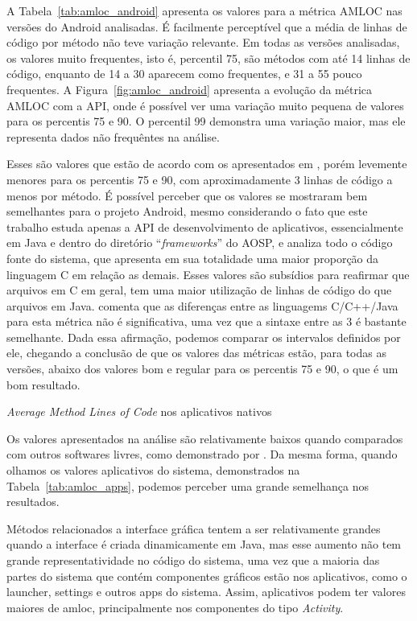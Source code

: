 A Tabela~\ref{tab:amloc_android} apresenta os valores para a métrica AMLOC nas versões do Android analisadas. É facilmente perceptível que a média de linhas de código por método não teve variação relevante. Em todas as versões analisadas, os valores muito frequentes, isto é, percentil 75, são métodos com até 14 linhas de código, enquanto de 14 a 30 aparecem como frequentes, e 31 a 55 pouco frequentes. A Figura~\ref{fig:amloc_android} apresenta a evolução da métrica AMLOC com a API, onde é possível ver uma variação muito pequena de valores para os percentis 75 e 90. O percentil 99 demonstra uma variação maior, mas ele representa dados não frequêntes na análise.

Esses são valores que estão de acordo com os apresentados em , porém levemente menores para os percentis 75 e 90, com aproximadamente 3 linhas de código a menos por método. É possível perceber que os valores se mostraram bem semelhantes para o projeto Android, mesmo considerando o fato que este trabalho estuda apenas a API de desenvolvimento de aplicativos, essencialmente em Java e dentro do diretório ``\textit{frameworks}'' do AOSP, e  analiza todo o código fonte do sistema, que apresenta em sua totalidade uma maior proporção da linguagem C em relação as demais. Esses valores são subsídios para reafirmar que arquivos em C em geral, tem uma maior utilização de linhas de código do que arquivos em Java.  comenta que as diferenças entre as linguagems C/C++/Java para esta métrica não é significativa, uma vez que a sintaxe entre as 3 é bastante semelhante. Dada essa afirmação, podemos comparar os intervalos definidos por ele, chegando a conclusão de que os valores das métricas estão, para todas as versões, abaixo dos valores bom e regular para os percentis 75 e 90, o que é um bom resultado.

\begin{table}[!htb]
\centering
{}

\caption{\textit{Average Method Lines of Code} nos aplicativos nativos}
\label{tab:amloc_apps}
\end{table}

Os valores apresentados na análise são relativamente baixos quando comparados com outros softwares livres, como demonstrado por . Da mesma forma, quando olhamos os valores aplicativos do sistema, demonstrados na Tabela~\ref{tab:amloc_apps}, podemos perceber uma grande semelhança nos resultados. 

Métodos relacionados a interface gráfica tentem a ser relativamente grandes quando a interface é criada dinamicamente em Java, mas esse aumento não tem grande representatividade no código do sistema, uma vez que a maioria das partes do sistema que contém componentes gráficos estão nos aplicativos, como o launcher, settings e outros apps do sistema. Assim, aplicativos podem ter valores maiores de amloc, principalmente nos componentes do tipo \textit{Activity}.

